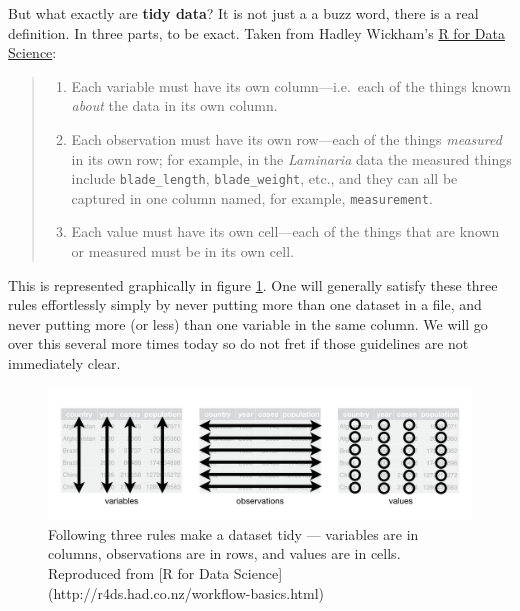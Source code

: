 \documentclass[
]{book}
\providecommand{\tightlist}{%
  \setlength{\itemsep}{0pt}\setlength{\parskip}{0pt}}
\begin{document}
But what exactly are \textbf{tidy data}? It is not just a a buzz word, there is a real definition. In three parts, to be exact. Taken from Hadley Wickham's \href{http://r4ds.had.co.nz/workflow-basics.html}{R for Data Science}:

\begin{quote}
\begin{enumerate}
\def\labelenumi{\arabic{enumi}.}
\tightlist
\item
  Each variable must have its own column---i.e.~each of the things known \emph{about} the data in its own column.
\item
  Each observation must have its own row---each of the things \emph{measured} in its own row; for example, in the \emph{Laminaria} data the measured things include \texttt{blade\_length}, \texttt{blade\_weight}, etc., and they can all be captured in one column named, for example, \texttt{measurement}.\\
\item
  Each value must have its own cell---each of the things that are known or measured must be in its own cell.
\end{enumerate}
\end{quote}

This is represented graphically in figure \ref{fig:tidy-structure}. One will generally satisfy these three rules effortlessly simply by never putting more than one dataset in a file, and never putting more (or less) than one variable in the same column. We will go over this several more times today so do not fret if those guidelines are not immediately clear.

\begin{figure}

{\centering \includegraphics[width=1\linewidth]{figures/tidy-1} 

}

\caption{Following three rules make a dataset tidy --- variables are in columns, observations are in rows, and values are in cells. Reproduced from [R for Data Science](http://r4ds.had.co.nz/workflow-basics.html)}\label{fig:tidy-structure}
\end{figure}
\end{document}
